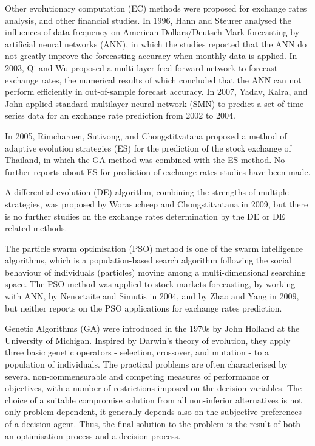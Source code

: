 Other evolutionary computation (EC) methods were proposed for
exchange rates analysis, and other financial studies. In 1996, Hann and
Steurer \cite{Hann1996} analysed the influences of data frequency on
American Dollars/Deutsch Mark forecasting by artificial neural
networks (ANN), in which the studies reported that the ANN do not greatly
improve the forecasting accuracy when monthly data is applied.
In 2003, Qi and Wu \cite{Qi2003} proposed a multi-layer feed forward
network to forecast exchange rates, the numerical results of which
concluded that the ANN can not perform efficiently in out-of-sample
forecast accuracy. In 2007, Yadav, Kalra, and John \cite{Yadav2007}
applied standard multilayer neural network (SMN) to predict a set of
time-series data for an exchange rate prediction from 2002 to 2004.

In 2005, Rimcharoen, Sutivong, and Chongstitvatana
\cite{Rimcharoen2005} proposed a method of adaptive evolution
strategies (ES) for the prediction of the stock exchange of
Thailand, in which the GA method was combined with the ES method.
No further reports about ES for prediction of exchange rates studies
have been made.

A differential evolution (DE) algorithm, combining the strengths of
multiple strategies, was proposed by Worasucheep and
Chongstitvatana \cite{Worasucheep2009} in 2009, but there is no
further studies on the exchange rates determination by the DE or DE
related methods.

The particle swarm optimisation (PSO) method is one of the swarm
intelligence algorithms, which is a population-based search
algorithm following the social behaviour of individuals
(particles) moving among a multi-dimensional searching space. The
PSO method was applied to stock markets forecasting, by working with ANN,
by Nenortaite and Simutis \cite{Nenortaite2004} in 2004, and by Zhao
and Yang \cite{Zhao2009} in 2009, but neither reports on the PSO
applications for exchange rates prediction.

Genetic Algorithms (GA) were introduced in the 1970s by John Holland
\cite{Holland1975} at the University of Michigan. Inspired by
Darwin's theory of evolution, they apply three basic genetic
operators - selection, crossover, and mutation - to a population
of individuals. The practical problems are often characterised by
several non-commensurable and competing measures of performance or
objectives, with a number of restrictions imposed on the decision
variables. The choice of a suitable compromise solution from all
non-inferior alternatives is not only problem-dependent, it
generally depends also on the subjective preferences of a decision
agent. Thus, the final solution to the problem is the result of both
an optimisation process and a decision process\cite{Chen_JAP_2011,Chen_AES_2011,Chen_OE_2011,Chen_CEC_2007}.

